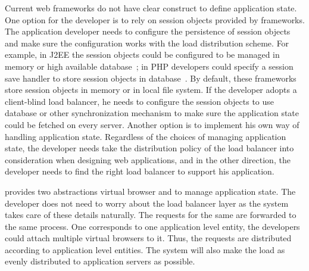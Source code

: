 
Current web frameworks do not have clear construct to define application state.
One option for the developer is to rely on session objects provided by frameworks.
The application developer needs to configure the persistence  of session objects 
and make sure the configuration works with the load distribution scheme.
For example, in J2EE the session objects could be configured to be managed in memory or
high available database~\cite{j2eedoc}; 
in PHP developers could specify a session save handler to store session objects 
in database~\cite{phpdoc}.
By default, these frameworks store session objects in memory or in local file system.
If the developer adopts a client-blind load balancer, 
he needs to configure the session objects to use database or other
synchronization mechanism to make sure the application state could be fetched on every server.
Another option is to implement his own way of handling application state.
Regardless of the choices of managing application state,
the developer needs take the distribution policy of the load balancer
into consideration when designing web applications,
and in the other direction,
the developer needs to find the right load balancer to support his application.




\cb{} provides two abstractions virtual browser and \appins{} to manage application state.
The developer does not need to worry about the load balancer layer as
the system takes care of these details naturally.
The requests for the same \appins{} are forwarded to the same \cb{} process.
One \appins{} corresponds to one application level entity, 
the developers could attach multiple virtual browsers to it.
Thus, the requests are distributed according to application level entities.
The system will also make the load as evenly distributed to application servers as possible.






